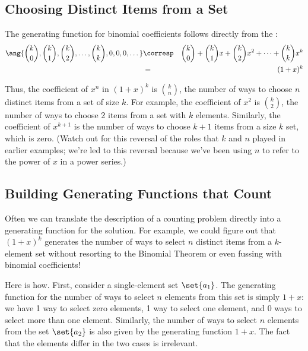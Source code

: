 \subsection{Choosing Distinct Items from a Set}

The generating function for binomial coefficients follows directly
from the :
%
\begin{eqnarray*}
\ang{ \binom{k}{0}, \binom{k}{1}, \binom{k}{2}, \dots, \binom{k}{k},
        0, 0, 0, \dots }
    & \corresp & \binom{k}{0} + \binom{k}{1} x + \binom{k}{2} x^2 + \cdots + \binom{k}{k} x^k \\
    & = & (1 + x)^k
\end{eqnarray*}

Thus, the coefficient of $x^n$ in $(1 + x)^k$ is $\binom{k}{n}$, the
number of ways to choose $n$ distinct items from a set of size $k$.  For
example, the coefficient of $x^2$ is $\binom{k}{2}$, the number of ways to
choose 2 items from a set with $k$ elements.  Similarly, the coefficient
of $x^{k+1}$ is the number of ways to choose $k+1$ items from a size $k$
set, which is zero.  (Watch out for this reversal of the roles that $k$
and $n$ played in earlier examples; we're led to this reversal because
we've been using $n$ to refer to the power of $x$ in a power series.)

\subsection{Building Generating Functions that Count}

Often we can translate the description of a counting problem directly
into a generating function for the solution.  For example, we could
figure out that $(1 + x)^k$ generates the number of ways to select $n$
distinct items from a $k$-element set without resorting to the
Binomial Theorem or even fussing with binomial coefficients!

Here is how.  First, consider a single-element set $\set{a_1}$.  The
generating function for the number of ways to select $n$ elements from
this set is simply $1 + x$: we have 1 way to select zero elements, 1
way to select one element, and 0 ways to select more than one element.
Similarly, the number of ways to select $n$ elements from the set
$\set{a_2}$ is also given by the generating function $1 + x$.  The
fact that the elements differ in the two cases is irrelevant.

